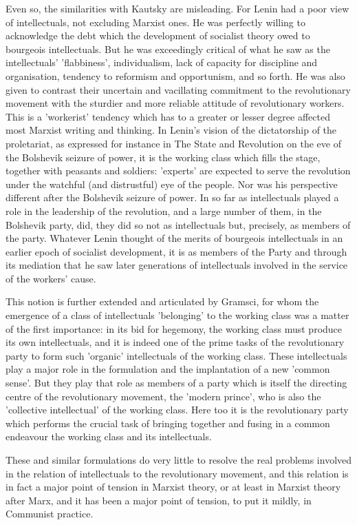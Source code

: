 Even so, the similarities with Kautsky are misleading. For Lenin had a poor view of intellectuals, not excluding Marxist ones. He was perfectly willing to acknowledge the debt which the development of socialist theory owed to bourgeois intellectuals. But he was exceedingly critical of what he saw as the intellectuals' 'flabbiness', individualism, lack of capacity for discipline and organisation, tendency to reformism and opportunism, and so forth. He was also given to contrast their uncertain and vacillating commitment to the revolutionary movement with the sturdier and more reliable attitude of revolutionary workers. This is a 'workerist' tendency which has to a greater or lesser degree affected most Marxist writing and thinking. In Lenin's vision of the dictatorship of the proletariat, as expressed for instance in The State and Revolution on the eve of the Bolshevik seizure of power, it is the working class which fills the stage, together with peasants and soldiers: 'experts' are expected to serve the revolution under the watchful (and distrustful) eye of the people. Nor was his perspective different after the Bolshevik seizure of power. In so far as intellectuals played a role in the leadership of the revolution, and a large number of them, in the Bolshevik party, did, they did so not as intellectuals but, precisely, as members of the party. Whatever Lenin thought of the merits of bourgeois intellectuals in an earlier epoch of socialist development, it is as members of the Party and through its mediation that he saw later generations of intellectuals involved in the service of the workers' cause.

This notion is further extended and articulated by Gramsci, for whom the emergence of a class of intellectuals 'belonging' to the working class was a matter of the first importance: in its bid for hegemony, the working class must produce its own intellectuals, and it is indeed one of the prime tasks of the revolutionary party to form such 'organic' intellectuals of the working class. These intellectuals play a major role in the formulation and the implantation of a new 'common sense'. But they play that role as members of a party which is itself the directing centre of the revolutionary movement, the 'modern prince', who is also the 'collective intellectual' of the working class. Here too it is the revolutionary party which performs the crucial task of bringing together and fusing in a common endeavour the working class and its intellectuals.

These and similar formulations do very little to resolve the real problems involved in the relation of intellectuals to the revolutionary movement, and this relation is in fact a major point of tension in Marxist theory, or at least in Marxist theory after Marx, and it has been a major point of tension, to put it mildly, in Communist practice.


